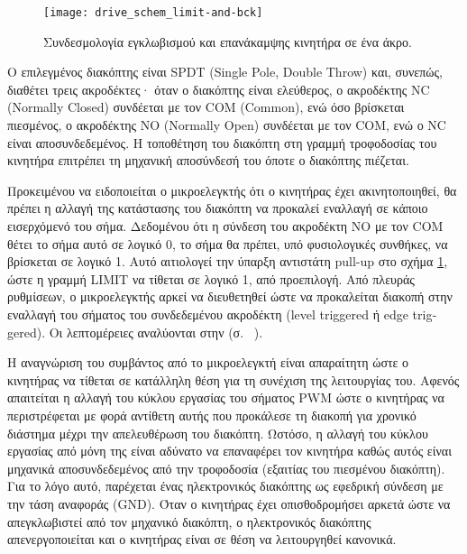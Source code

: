 \begin{figure}
    \caption{Συνδεσμολογία εγκλωβισμού και επανάκαμψης κινητήρα σε ένα άκρο.
    \label{fig:motor:limit-switch}}
    \begin{center}
    \texttt{[image: drive\_schem\_limit-and-bck]}
    \end{center}
\end{figure}

Ο επιλεγμένος διακόπτης είναι SPDT (\textenglish{Single Pole, Double Throw})
και, συνεπώς, διαθέτει τρεις ακροδέκτες· όταν ο διακόπτης είναι ελεύθερος, ο
ακροδέκτης NC (\textenglish{Normally Closed}) συνδέεται με τον COM
(\textenglish{Common}), ενώ όσο βρίσκεται πιεσμένος, ο ακροδέκτης NO
(\textenglish{Normally Open}) συνδέεται με τον COM, ενώ ο NC είναι
αποσυνδεδεμένος. Η τοποθέτηση του διακόπτη στη γραμμή τροφοδοσίας του κινητήρα
επιτρέπει τη μηχανική αποσύνδεσή του όποτε ο διακόπτης πιέζεται.

Προκειμένου να ειδοποιείται ο μικροελεγκτής ότι ο κινητήρας έχει ακινητοποιηθεί,
θα πρέπει η αλλαγή της κατάστασης του διακόπτη να προκαλεί εναλλαγή σε κάποιο
εισερχόμενό του σήμα. Δεδομένου ότι η σύνδεση του ακροδέκτη NO με τον COM θέτει
το σήμα αυτό σε λογικό 0, το σήμα θα πρέπει, υπό φυσιολογικές συνθήκες, να
βρίσκεται σε λογικό 1. Αυτό αιτιολογεί την ύπαρξη αντιστάτη pull-up στο
σχήμα \ref{fig:motor:limit-switch}, ώστε η γραμμή LIMIT να τίθεται σε λογικό 1,
από προεπιλογή. Από πλευράς ρυθμίσεων, ο μικροελεγκτής αρκεί να διευθετηθεί ώστε
να προκαλείται διακοπή στην εναλλαγή του σήματος του συνδεδεμένου ακροδέκτη
(\textenglish{level triggered} ή \textenglish{edge triggered}). Οι λεπτομέρειες
αναλύονται στην  (σ.~%
\pageref{subsec:motor:limit-pin-change}).

Η αναγνώριση του συμβάντος από το μικροελεγκτή είναι απαραίτητη ώστε ο κινητήρας
να τίθεται σε κατάλληλη θέση για τη συνέχιση της λειτουργίας του. Αφενός
απαιτείται η αλλαγή του κύκλου εργασίας του σήματος PWM ώστε ο κινητήρας να
περιστρέφεται με φορά αντίθετη αυτής που προκάλεσε τη διακοπή για χρονικό
διάστημα μέχρι την απελευθέρωση του διακόπτη.
Ωστόσο, η αλλαγή
του κύκλου εργασίας από μόνη της είναι αδύνατο να επαναφέρει τον κινητήρα καθώς
αυτός είναι μηχανικά αποσυνδεδεμένος από την τροφοδοσία (εξαιτίας του πιεσμένου
διακόπτη).
Για το λόγο αυτό, παρέχεται ένας ηλεκτρονικός διακόπτης ως εφεδρική σύνδεση με
την τάση αναφοράς (GND). Όταν ο κινητήρας έχει οπισθοδρομήσει αρκετά ώστε να
απεγκλωβιστεί από τον μηχανικό διακόπτη, ο ηλεκτρονικός διακόπτης
απενεργοποιείται και ο κινητήρας είναι σε θέση να λειτουργηθεί κανονικά.

